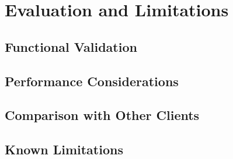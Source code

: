 \usepackage{lipsum}\chapter{Evaluation and Limitations} \label{cap:evaluation}


\section{Functional Validation}
\lipsum[1]


\section{Performance Considerations}
\lipsum[1]


\section{Comparison with Other Clients}
\lipsum[1]


\section{Known Limitations}
\lipsum[1]
